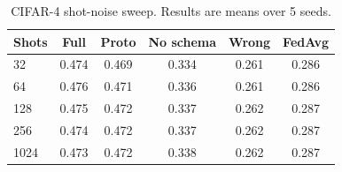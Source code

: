 \begin{table}[t]
\centering
\caption{CIFAR-4 shot-noise sweep. Results are means over 5 seeds.}
\label{tab:shot}
\begin{tabular}{lccccc}
\toprule
Shots & Full & Proto & No schema & Wrong & FedAvg \\
\midrule
32 & 0.474 & 0.469 & 0.334 & 0.261 & 0.286 \\
64 & 0.476 & 0.471 & 0.336 & 0.261 & 0.286 \\
128 & 0.475 & 0.472 & 0.337 & 0.262 & 0.287 \\
256 & 0.474 & 0.472 & 0.337 & 0.262 & 0.287 \\
1024 & 0.473 & 0.472 & 0.338 & 0.262 & 0.287 \\
\bottomrule
\end{tabular}
\end{table}
